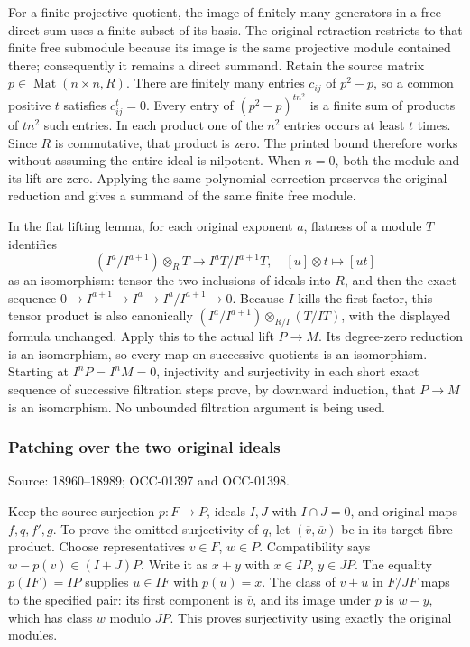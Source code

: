 For a finite projective quotient, the image of finitely many generators in a free direct sum uses a finite subset of its basis. The original retraction restricts to that finite free submodule because its image is the same projective module contained there; consequently it remains a direct summand. Retain the source matrix \(p\in\operatorname{Mat}(n\times n,R)\). There are finitely many entries \(c_{ij}\) of \(p^2-p\), so a common positive \(t\) satisfies \(c_{ij}^t=0\). Every entry of \((p^2-p)^{tn^2}\) is a finite sum of products of \(tn^2\) such entries. In each product one of the \(n^2\) entries occurs at least \(t\) times. Since \(R\) is commutative, that product is zero. The printed bound therefore works without assuming the entire ideal is nilpotent. When \(n=0\), both the module and its lift are zero. Applying the same polynomial correction preserves the original reduction and gives a summand of the same finite free module.

In the flat lifting lemma, for each original exponent \(a\), flatness of a module \(T\) identifies \[
(I^a/I^{a+1})\otimes_RT\longrightarrow I^aT/I^{a+1}T,
\quad [u]\otimes t\longmapsto[ut]
\] as an isomorphism: tensor the two inclusions of ideals into \(R\), and then the exact sequence \(0\to I^{a+1}\to I^a\to I^a/I^{a+1}\to0\). Because \(I\) kills the first factor, this tensor product is also canonically \((I^a/I^{a+1})\otimes_{R/I}(T/IT)\), with the displayed formula unchanged. Apply this to the actual lift \(P\to M\). Its degree-zero reduction is an isomorphism, so every map on successive quotients is an isomorphism. Starting at \(I^nP=I^nM=0\), injectivity and surjectivity in each short exact sequence of successive filtration steps prove, by downward induction, that \(P\to M\) is an isomorphism. No unbounded filtration argument is being used.

\subsubsection{Patching over the two original ideals}\label{algebra-proof-009-patching-over-the-two-original-ideals}

Source: 18960--18989; OCC-01397 and OCC-01398.

Keep the source surjection \(p:F\to P\), ideals \(I,J\) with \(I\cap J=0\), and original maps \(f,q,f',g\). To prove the omitted surjectivity of \(q\), let \((\overline v,\overline w)\) be in its target fibre product. Choose representatives \(v\in F\), \(w\in P\). Compatibility says \(w-p(v)\in(I+J)P\). Write it as \(x+y\) with \(x\in IP\), \(y\in JP\). The equality \(p(IF)=IP\) supplies \(u\in IF\) with \(p(u)=x\). The class of \(v+u\) in \(F/JF\) maps to the specified pair: its first component is \(\overline v\), and its image under \(p\) is \(w-y\), which has class \(\overline w\) modulo \(JP\). This proves surjectivity using exactly the original modules.

